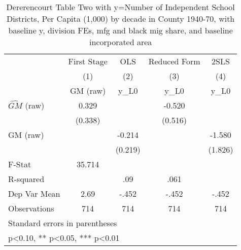 \begin{table}[htbp]\centering
\def\sym#1{\ifmmode^{#1}\else\(^{#1}\)\fi}
\caption{Dererencourt Table Two with y=Number of Independent School Districts, Per Capita (1,000) by decade in County 1940-70, with baseline y, division FEs, mfg and black mig share, and baseline incorporated area}
\begin{tabular}{l*{4}{c}}
\toprule
                    & First Stage   &         OLS   &Reduced Form   &        2SLS   \\
                    &\multicolumn{1}{c}{(1)}&\multicolumn{1}{c}{(2)}&\multicolumn{1}{c}{(3)}&\multicolumn{1}{c}{(4)}\\
                    &\multicolumn{1}{c}{GM  (raw)}&\multicolumn{1}{c}{y\_L0}&\multicolumn{1}{c}{y\_L0}&\multicolumn{1}{c}{y\_L0}\\
\midrule
$\hat{GM}$ (raw)    &       0.329   &               &      -0.520   &               \\
                    &     (0.338)   &               &     (0.516)   &               \\
\addlinespace
GM  (raw)           &               &      -0.214   &               &      -1.580   \\
                    &               &     (0.219)   &               &     (1.826)   \\
\midrule
F-Stat              &      35.714   &               &               &               \\
R-squared           &               &         .09   &        .061   &               \\
Dep Var Mean        &        2.69   &       -.452   &       -.452   &       -.452   \\
Observations        &         714   &         714   &         714   &         714   \\
\bottomrule
\multicolumn{5}{l}{\footnotesize Standard errors in parentheses}\\
\multicolumn{5}{l}{\footnotesize * p<0.10, ** p<0.05, *** p<0.01}\\
\end{tabular}
\end{table}
